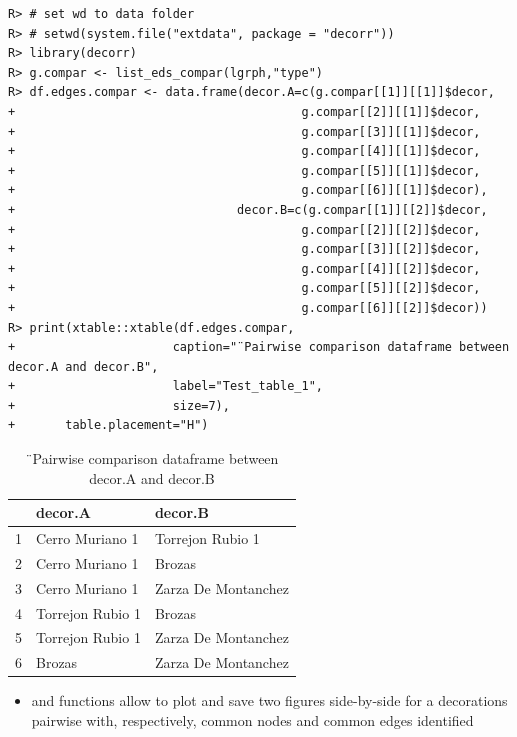 \documentclass[article]{jss}\usepackage{knitr}
\begin{document}
\begin{kframe}
\begin{verbatim}
R> # set wd to data folder
R> # setwd(system.file("extdata", package = "decorr"))
R> library(decorr)
R> g.compar <- list_eds_compar(lgrph,"type")
R> df.edges.compar <- data.frame(decor.A=c(g.compar[[1]][[1]]$decor,
+                                        g.compar[[2]][[1]]$decor,
+                                        g.compar[[3]][[1]]$decor,
+                                        g.compar[[4]][[1]]$decor,
+                                        g.compar[[5]][[1]]$decor,
+                                        g.compar[[6]][[1]]$decor),
+                               decor.B=c(g.compar[[1]][[2]]$decor,
+                                        g.compar[[2]][[2]]$decor,
+                                        g.compar[[3]][[2]]$decor,
+                                        g.compar[[4]][[2]]$decor,
+                                        g.compar[[5]][[2]]$decor,
+                                        g.compar[[6]][[2]]$decor))
R> print(xtable::xtable(df.edges.compar,
+                      caption="¨Pairwise comparison dataframe between decor.A and decor.B",
+                      label="Test_table_1",
+                      size=7),
+       table.placement="H")
\end{verbatim}
\end{kframe}%
\begin{table}[H]
\centering
\begin{tabular}{rll}
  \hline
 & decor.A & decor.B \\ 
  \hline
1 & Cerro Muriano 1 & Torrejon Rubio 1 \\ 
  2 & Cerro Muriano 1 & Brozas \\ 
  3 & Cerro Muriano 1 & Zarza De Montanchez \\ 
  4 & Torrejon Rubio 1 & Brozas \\ 
  5 & Torrejon Rubio 1 & Zarza De Montanchez \\ 
  6 & Brozas & Zarza De Montanchez \\ 
   \hline
\end{tabular}
\caption{¨Pairwise comparison dataframe between decor.A and decor.B} 
\label{Test_table_1}
\end{table}


\begin{itemize} 
\setlength\itemsep{.1em}
  \item {} and  functions allow to plot and save two figures side-by-side for a decorations pairwise with, respectively, common nodes and common edges identified
\end{itemize}
\end{document}
